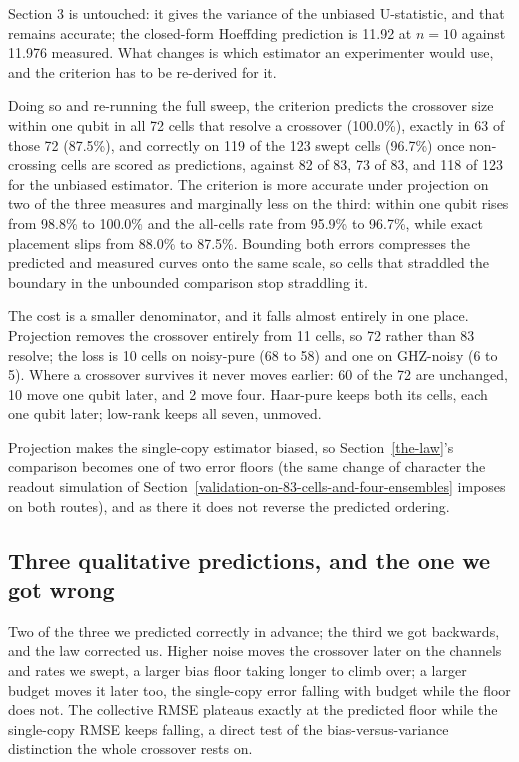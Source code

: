 \documentclass[a4paper,superscriptaddress,nofootinbib,onecolumn,nopdfoutputerror]{quantumarticle}
\begin{document}
Section 3 is untouched: it gives the variance of the unbiased U-statistic, and
that remains accurate; the closed-form Hoeffding prediction is 11.92 at
\(n = 10\) against 11.976 measured. What changes is which estimator an
experimenter would use, and the criterion has to be re-derived for it.

Doing so and re-running the full sweep, the criterion predicts the crossover
size within one qubit in all 72 cells that resolve a crossover (100.0\%),
exactly in 63 of those 72 (87.5\%), and correctly on 119 of the 123 swept
cells (96.7\%) once non-crossing cells are scored as predictions, against
82 of 83, 73 of 83, and 118 of 123 for the unbiased estimator. The criterion
is more accurate under projection on two of the three measures and marginally less on the
third: within one qubit rises from 98.8\% to 100.0\% and the all-cells rate from 95.9\% to
96.7\%, while exact placement slips from 88.0\% to 87.5\%. Bounding both errors compresses
the predicted and measured curves onto the same scale, so cells that
straddled the boundary in the unbounded comparison stop straddling it.

The cost is a smaller denominator, and it falls almost entirely in one place. Projection
removes the crossover entirely from 11 cells, so 72 rather than 83 resolve; the loss is 10 cells
on noisy-pure (68 to 58) and one on GHZ-noisy (6 to 5). Where
a crossover survives it never moves earlier: 60 of the 72 are unchanged, 10
move one qubit later, and 2 move four. Haar-pure keeps both its cells, each
one qubit later; low-rank keeps all seven, unmoved.

Projection makes the single-copy estimator biased, so
Section~\ref{the-law}'s comparison becomes one of two error floors (the same
change of character the readout simulation of
Section~\ref{validation-on-83-cells-and-four-ensembles} imposes on both routes),
and as there it does not reverse the predicted ordering.

\hypertarget{three-qualitative-predictions-and-the-one-we-got-wrong}{%
\subsection{Three qualitative predictions, and the one we got
wrong}\label{three-qualitative-predictions-and-the-one-we-got-wrong}}

Two of the three we predicted correctly in advance; the third we got
backwards, and the law corrected us. Higher noise moves the crossover later on
the channels and rates we swept, a larger bias floor taking longer to climb over;
a larger budget moves it later too, the single-copy error falling with budget
while the floor does not. The collective RMSE plateaus exactly at the predicted
floor while the single-copy RMSE keeps falling, a direct test of the bias-versus-variance distinction the whole crossover rests on.
\end{document}
